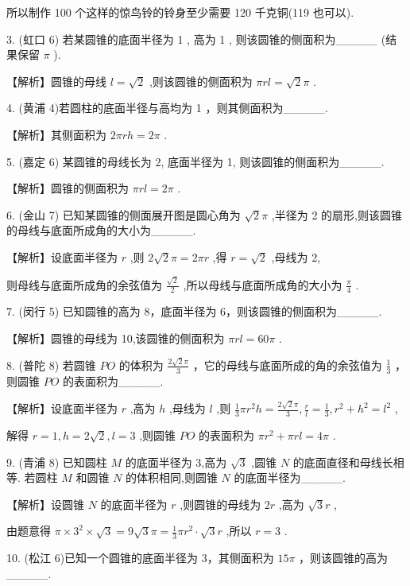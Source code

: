 \documentclass[10pt]{article}
\begin{document}
所以制作 100 个这样的惊鸟铃的铃身至少需要 120 千克铜(119 也可以).

3. (虹口 6) 若某圆锥的底面半径为 1 , 高为 1 , 则该圆锥的侧面积为\_\_\_\_\_ (结果保留 \(\pi\) ).

【解析】圆锥的母线 \(l = \sqrt{2}\) ,则该圆锥的侧面积为 \({\pi rl} = \sqrt{2}\pi\) .

4. (黄浦 4)若圆柱的底面半径与高均为 1 ，则其侧面积为\_\_\_\_\_.

【解析】其侧面积为 \({2\pi rh} = {2\pi }\) .

5. (嘉定 6) 某圆锥的母线长为 2, 底面半径为 1, 则该圆锥的侧面积为\_\_\_\_\_.

【解析】圆锥的侧面积为 \({\pi rl} = {2\pi }\) .

6. (金山 7) 已知某圆锥的侧面展开图是圆心角为 \(\sqrt{2}\pi\) ,半径为 2 的扇形,则该圆锥的母线与底面所成角的大小为\_\_\_\_\_.

【解析】设底面半径为 \(r\) ,则 \(2\sqrt{2}\pi  = {2\pi r}\) ,得 \(r = \sqrt{2}\) ,母线为 2,

则母线与底面所成角的余弦值为 \(\frac{\sqrt{2}}{2}\) ,所以母线与底面所成角的大小为 \(\frac{\pi }{4}\) .

7. (闵行 5) 已知圆锥的高为 8，底面半径为 6，则该圆锥的侧面积为\_\_\_\_\_.

【解析】圆锥的母线为 10,该圆锥的侧面积为 \({\pi rl} = {60\pi }\) .

8. (普陀 8) 若圆锥 \({PO}\) 的体积为 \(\frac{2\sqrt{2}\pi }{3}\) ，它的母线与底面所成的角的余弦值为 \(\frac{1}{3}\) ，则圆锥 \({PO}\) 的表面积为\_\_\_\_\_.

【解析】设底面半径为 \(r\) ,高为 \(h\) ,母线为 \(l\) ,则 \(\frac{1}{3}\pi {r}^{2}h = \frac{2\sqrt{2}\pi }{3},\frac{r}{l} = \frac{1}{3},{r}^{2} + {h}^{2} = {l}^{2}\) ,

解得 \(r = 1,h = 2\sqrt{2},l = 3\) ,则圆锥 \({PO}\) 的表面积为 \(\pi {r}^{2} + {\pi rl} = {4\pi }\) .

9. (青浦 8) 已知圆柱 \(M\) 的底面半径为 3,高为 \(\sqrt{3}\) ,圆锥 \(N\) 的底面直径和母线长相等. 若圆柱 \(M\) 和圆锥 \(N\) 的体积相同,则圆锥 \(N\) 的底面半径为\_\_\_\_\_.

【解析】设圆锥 \(N\) 的底面半径为 \(r\) ,则圆锥的母线为 \({2r}\) ,高为 \(\sqrt{3}r\) ,

由题意得 \(\pi  \times  {3}^{2} \times  \sqrt{3} = 9\sqrt{3}\pi  = \frac{1}{3}\pi {r}^{2} \cdot  \sqrt{3}r\) ,所以 \(r = 3\) .

10. (松江 6)已知一个圆锥的底面半径为 3，其侧面积为 \({15\pi }\) ，则该圆锥的高为\_\_\_\_\_.
\end{document}
